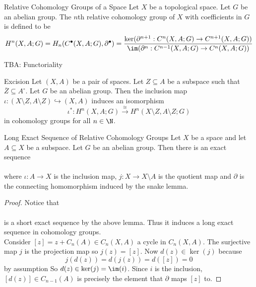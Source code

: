 \documentclass[a4paper]{article}
\begin{document}
\begin{defn}{Relative Cohomology Groups of a Space}{} Let $X$ be a topological space. Let $G$ be an abelian group. The $n$th relative cohomology group of $X$ with coefficients in $G$ is defined to be $$H^n(X,A;G)=H_n(C^\bullet(X,A;G),\partial^\bullet)=\frac{\ker(\partial^{n+1}:C^n(X,A;G)\to C^{n+1}(X,A;G))}{\im(\partial^n:C^{n-1}(X,A;G)\to C^n(X,A;G))}$$
\end{defn}

TBA: Functoriality

\begin{thm}{Excision}{} Let $(X,A)$ be a pair of spaces. Let $Z\subseteq A$ be a subspace such that $\overline{Z}\subseteq A^\circ$. Let $G$ be an abelian group. Then the inclusion map $\iota:(X\setminus Z,A\setminus Z)\hookrightarrow(X,A)$ induces an isomorphism $$\iota^\ast:H^n(X,A;G)\overset{\cong}{\longrightarrow}H^n(X\setminus Z,A\setminus Z;G)$$ in cohomology groups for all $n\in\N$. 
\end{thm}

\begin{thm}{Long Exact Sequence of Relative Cohomology Groups}{} Let $X$ be a space and let $A\subseteq X$ be a subspace. Let $G$ be an abelian group. Then there is an exact sequence \\
\\
where $\iota:A\to X$ is the inclusion map, $j:X\to X\setminus A$ is the quotient map and $\partial$ is the connecting homomorphism induced by the snake lemma. 
\begin{proof}
Notice that \\
\\
is a short exact sequence by the above lemma. Thus it induces a long exact sequence in cohomology groups. \\

Consider $[z]=z+C_n(A)\in C_n(X,A)$ a cycle in $C_n(X,A)$. The surjective map $j$ is the projection map so $j(z)=[z]$. Now $d(z)\in\ker(j)$ because $$j(d(z))=d(j(z))=d([z])=0$$ by assumption So $d(z)\in\ker(j)=\im(i)$. Since $i$ is the inclusion, $[d(z)]\in C_{n-1}(A)$ is precisely the element that $\partial$ maps $[z]$ to. 
\end{proof}
\end{thm}
\end{document}
